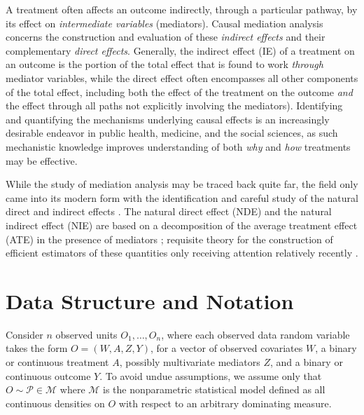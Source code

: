 \documentclass[12pt, krantz2,]{krantz}
\theoremstyle{definition}
\theoremstyle{definition}
\theoremstyle{definition}
\newcommand{\M}{\mathcal{M}}
\newcommand{\1}{\mathbbm{1}}
\begin{document}
A treatment often affects an outcome indirectly, through a particular pathway,
by its effect on \emph{intermediate variables} (mediators). Causal mediation analysis
concerns the construction and evaluation of these \emph{indirect effects} and their
complementary \emph{direct effects}. Generally, the indirect effect (IE) of a
treatment on an outcome is the portion of the total effect that is found to work
\emph{through} mediator variables, while the direct effect often encompasses all
other components of the total effect, including both the effect of the treatment
on the outcome \emph{and} the effect through all paths not explicitly involving the
mediators). Identifying and quantifying the mechanisms underlying causal effects
is an increasingly desirable endeavor in public health, medicine, and the social
sciences, as such mechanistic knowledge improves understanding of both \emph{why} and
\emph{how} treatments may be effective.

While the study of mediation analysis may be traced back quite far, the field
only came into its modern form with the identification and careful study of the
natural direct and indirect effects \citep{robins1992identifiability, pearl2001direct}. The natural direct effect (NDE) and the natural indirect
effect (NIE) are based on a decomposition of the average treatment effect (ATE)
in the presence of mediators \citep{vanderweele2015explanation}; requisite
theory for the construction of efficient estimators of these quantities only
receiving attention relatively recently \citep{tchetgen2012semiparametric}.

\hypertarget{data-structure-and-notation-2}{%
\section{Data Structure and Notation}\label{data-structure-and-notation-2}}

Consider \(n\) observed units \(O_1, \ldots, O_n\), where each observed data random
variable takes the form \(O = (W, A, Z, Y)\), for a vector of observed covariates
\(W\), a binary or continuous treatment \(A\), possibly multivariate mediators \(Z\),
and a binary or continuous outcome \(Y\). To avoid undue assumptions, we assume
only that \(O \sim \mathcal{P} \in \M\) where \(\M\) is the nonparametric
statistical model defined as all continuous densities on \(O\) with respect to an
arbitrary dominating measure.
\end{document}

